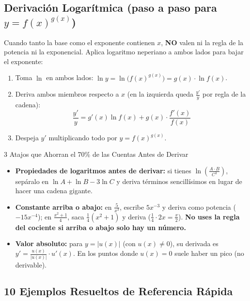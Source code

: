 \documentclass[10pt,a4paper]{article}
\begin{document}
\subsection*{Derivación Logarítmica (paso a paso para $y = f(x)^{g(x)}$)}
Cuando tanto la base como el exponente contienen $x$, \textbf{NO} valen ni la regla de la potencia ni la exponencial. Aplica logaritmo neperiano a ambos lados para bajar el exponente:
\begin{enumerate}\itemsep 1.5pt
  \item Toma $\ln$ en ambos lados: $\ln y = \ln\big(f(x)^{g(x)}\big) = g(x)\cdot\ln f(x)$.
  \item Deriva ambos miembros respecto a $x$ (en la izquierda queda $\frac{y'}{y}$ por regla de la cadena):
  $$\frac{y'}{y} = g'(x)\ln f(x) + g(x)\cdot\frac{f'(x)}{f(x)}$$
  \item Despeja $y'$ multiplicando todo por $y = f(x)^{g(x)}$.
\end{enumerate}

\begin{trucobox}{3 Atajos que Ahorran el 70\% de las Cuentas Antes de Derivar}
\begin{itemize}\itemsep 1.5pt
  \item \textbf{Propiedades de logaritmos antes de derivar:} si tienes $\ln\!\left(\frac{A\cdot B}{C^3}\right)$, sepáralo en $\ln A + \ln B - 3\ln C$ y deriva términos sencillísimos en lugar de hacer una cadena gigante.
  \item \textbf{Constante arriba o abajo:} en $\frac{5}{x^3}$, escribe $5x^{-3}$ y deriva como potencia ($-15x^{-4}$); en $\frac{x^2+1}{4}$, saca $\frac{1}{4}(x^2+1)$ y deriva ($\frac{1}{4}\cdot 2x = \frac{x}{2}$). \textbf{No uses la regla del cociente si arriba o abajo solo hay un número.}
  \item \textbf{Valor absoluto:} para $y = |u(x)|$ (con $u(x) \neq 0$), su derivada es $\displaystyle y' = \frac{u(x)}{|u(x)|}\cdot u'(x)$. En los puntos donde $u(x) = 0$ suele haber un pico (no derivable).
\end{itemize}
\end{trucobox}

\subsection*{10 Ejemplos Resueltos de Referencia Rápida}
\end{document}
